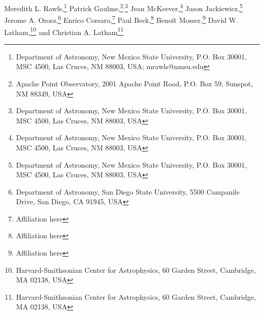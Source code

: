 

Meredith L. Rawls,\footnote{Department of Astronomy, New Mexico State University, P.O. Box 30001, MSC 4500, Las Cruces, NM 88003, USA; mrawls@nmsu.edu}
\setcounter{footnote}{1}
Patrick Gaulme,\footnote{Apache Point Observatory, 2001 Apache Point Road, P.O. Box 59, Sunspot, NM 88349, USA}\setcounter{footnote}{0}$^{,}$\footnote{Department of Astronomy, New Mexico State University, P.O. Box 30001, MSC 4500, Las Cruces, NM 88003, USA}
\setcounter{footnote}{0}
Jean McKeever,\footnote{Department of Astronomy, New Mexico State University, P.O. Box 30001, MSC 4500, Las Cruces, NM 88003, USA}
\setcounter{footnote}{0}
Jason Jackiewicz,\footnote{Department of Astronomy, New Mexico State University, P.O. Box 30001, MSC 4500, Las Cruces, NM 88003, USA}
\setcounter{footnote}{2}
Jerome A. Orosz,\footnote{Department of Astronomy, San Diego State University, 5500 Campanile Drive, San Diego, CA 91945, USA}
Enrico Corsaro,\footnote{Affiliation here}
Paul Beck,\footnote{Affiliation here}
Beno\^it Mosser,\footnote{Affiliation here}
David W. Latham,\footnote{Harvard-Smithsonian Center for Astrophysics, 60 Garden Street, Cambridge, MA 02138, USA} and 
\setcounter{footnote}{6}
Christian A. Latham\footnote{Harvard-Smithsonian Center for Astrophysics, 60 Garden Street, Cambridge, MA 02138, USA}


